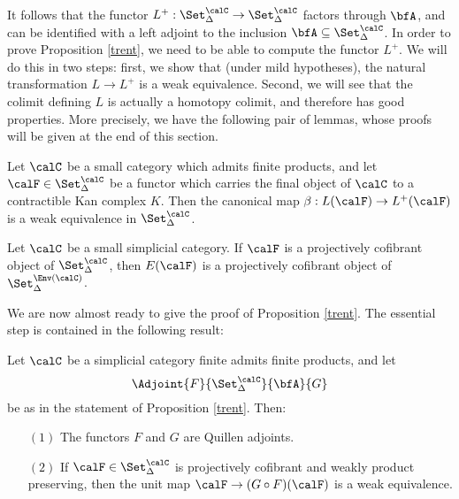 It follows that the functor $L^{+}: \Set_{\Delta}^{\calC} \rightarrow \Set_{\Delta}^{\calC}$ factors through $\bfA$, and can be identified with a left adjoint to the inclusion
$\bfA \subseteq \Set_{\Delta}^{\calC}$. In order to prove Proposition \ref{trent}, we need to be able to compute the functor $L^{+}$. We will do this in two steps: first, we show that (under mild hypotheses), the natural transformation $L \rightarrow L^{+}$ is a weak equivalence. Second, we will see that the colimit defining $L$ is actually a homotopy colimit, and therefore has good properties. More precisely, we have the following pair of lemmas, whose proofs will be given at the end of this section.

\begin{lemma}\label{toughstuff}
Let $\calC$ be a small category which admits finite products, and let $\calF \in \Set_{\Delta}^{\calC}$ be a functor which carries the final object of $\calC$ to a contractible Kan complex $K$. Then the canonical map $\beta: L(\calF) \rightarrow L^{+}(\calF)$ is a weak equivalence in $\Set_{\Delta}^{\calC}$.
\end{lemma}

\begin{lemma}\label{trentlem}
Let $\calC$ be a small simplicial category. If $\calF$ is a projectively cofibrant object of $\Set_{\Delta}^{\calC}$, then $E(\calF)$ is a projectively cofibrant object of $\Set_{\Delta}^{\Env(\calC)}$. 
\end{lemma}

We are now almost ready to give the proof of Proposition \ref{trent}. The essential step is contained in the following result:

\begin{lemma}\label{presut}
Let $\calC$ be a simplicial category finite admits finite products, and let
$$ \Adjoint{ F }{ \Set_{\Delta}^{\calC} }{ \bfA }{ G}$$
be as in the statement of Proposition \ref{trent}. Then:
\begin{itemize}
\item[$(1)$] The functors $F$ and $G$ are Quillen adjoints.
\item[$(2)$] If $\calF \in \Set_{\Delta}^{\calC}$ is projectively cofibrant and weakly product preserving, then the unit map $\calF \rightarrow (G \circ F)(\calF)$ is a weak equivalence.
\end{itemize}
\end{lemma}


